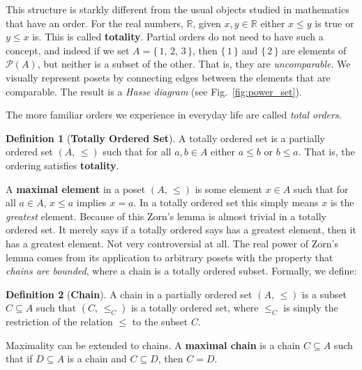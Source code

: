 \documentclass{article}
\theoremstyle{definition}
\newtheorem{definition}{Definition}[section]
\begin{document}
            This structure is starkly different from the usual objects studied
            in mathematics that have an order. For the real numbers,
            $\mathbb{R}$, given $x,y\in\mathbb{R}$ either $x\leq{y}$ is true
            or $y\leq{x}$ is. This is called \textbf{totality}. Partial orders
            do not need to have such a concept, and indeed if we set
            $A=\{\,1,\,2,\,3\,\}$, then $\{\,1\,\}$ and $\{\,2\,\}$ are elements
            of $\mathcal{P}(A)$, but neither is a subset of the other. That is,
            they are \textit{uncomparable}. We visually represent posets by
            connecting edges between the elements that are comparable. The
            result is a \textit{Hasse diagram} (see Fig.~\ref{fig:power_set}).
            \par\hfill\par
            The more familiar orders we experience in everyday life are
            called \textit{total orders}.
            \begin{definition}[\textbf{Totally Ordered Set}]
                A totally ordered set is a partially ordered set
                $(A,\,\leq)$ such that for all $a,b\in{A}$ either
                $a\leq{b}$ or $b\leq{a}$. That is, the ordering satisfies
                \textbf{totality}.
            \end{definition}
            A \textbf{maximal element} in a poset $(A,\,\leq)$ is some element
            $x\in{A}$ such that for all $a\in{A}$, $x\leq{a}$ implies $x=a$.
            In a totally ordered set this simply means $x$ is the
            \textit{greatest} element. Because of this
            Zorn's lemma is almost trivial in a totally ordered set. It merely
            says if a totally ordered says has a greatest element, then it has
            a greatest element. Not very controversial at all. The real power
            of Zorn's lemma comes from its application to arbitrary posets
            with the property that \textit{chains are bounded}, where a chain
            is a totally ordered subset. Formally, we define:
            \begin{definition}[\textbf{Chain}]
                A chain in a partially ordered set $(A,\,\leq)$ is a subset
                $C\subseteq{A}$ such that $(C,\,\leq_{C})$ is a totally ordered
                set, where $\leq_{C}$ is simply the restriction of the relation
                $\leq$ to the subset $C$.
            \end{definition}
            Maximality can be extended to chains. A
            \textbf{maximal chain} is a chain $C\subseteq{A}$ such that if
            $D\subseteq{A}$ is a chain and $C\subseteq{D}$, then $C=D$.
\end{document}
